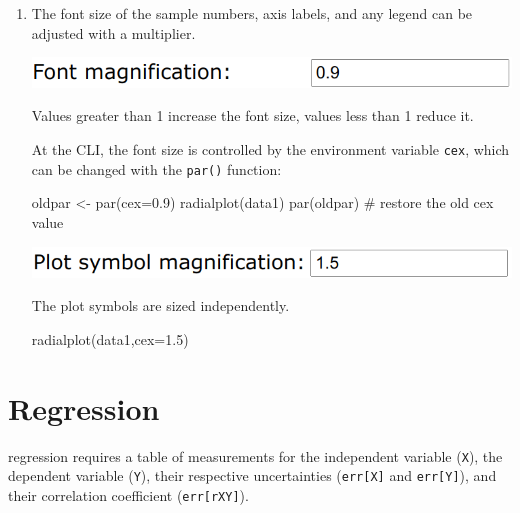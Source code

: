 \begin{refsection}
\begin{enumerate}
\item The font size of the sample numbers, axis labels, and any legend
  can be adjusted with a multiplier.

\noindent\begin{minipage}[t]{.5\linewidth}
\strut\vspace*{-\baselineskip}\newline
\includegraphics[width=\linewidth]{../figures/OtherRadialCEX.png}
\end{minipage}
\begin{minipage}[t]{.5\linewidth}
Values greater than 1 increase the font size, values less than 1
reduce it.  
\end{minipage}

At the CLI, the font size is controlled by the environment variable
\texttt{cex}, which can be changed with the \texttt{par()} function:

\begin{script}
oldpar <- par(cex=0.9)
radialplot(data1)
par(oldpar) # restore the old cex value
\end{script}

\noindent\begin{minipage}[t]{.5\linewidth}
\strut\vspace*{-\baselineskip}\newline
\includegraphics[width=\linewidth]{../figures/OtherRadialPCHcex.png}
\end{minipage}
\begin{minipage}[t]{.5\linewidth}
The plot symbols are sized independently.
\end{minipage}

\begin{console}
radialplot(data1,cex=1.5)
\end{console}

\end{enumerate}

\section{Regression}\label{sec:OtherRegression}

\citet{york2004} regression requires a table of measurements for the
independent variable (\texttt{X}), the dependent variable
(\texttt{Y}), their respective uncertainties (\texttt{err[X]} and
\texttt{err[Y]}), and their correlation coefficient
(\texttt{err[rXY]}).\\


\end{refsection}
